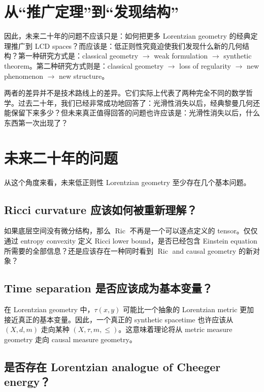 \documentclass[lualatex]{article}
\begin{document}
\section{从“推广定理”到“发现结构”}

因此，未来二十年的问题不应该只是：如何把更多 Lorentzian geometry 的经典定理推广到 LCD spaces？而应该是：低正则性究竟迫使我们发现什么新的几何结构？第一种研究方式是：classical geometry $\longrightarrow$ weak formulation $\longrightarrow$ synthetic theorem。第二种研究方式则是：classical geometry $\longrightarrow$ loss of regularity $\longrightarrow$ new phenomenon $\longrightarrow$ new structure。

两者的差异并不是技术路线上的差异。它们实际上代表了两种完全不同的数学哲学。过去二十年，我们已经非常成功地回答了：光滑性消失以后，经典黎曼几何还能保留下来多少？但未来真正值得回答的问题也许应该是：光滑性消失以后，什么东西第一次出现了？

\section{未来二十年的问题}

从这个角度来看，未来低正则性 Lorentzian geometry 至少存在几个基本问题。

\subsection{Ricci curvature 应该如何被重新理解？}

如果底层空间没有微分结构，那么 $\operatorname{Ric}$ 不再是一个可以逐点定义的 tensor。仅仅通过 entropy convexity 定义 Ricci lower bound，是否已经包含 Einstein equation 所需要的全部信息？还是应该存在一种同时看到 $\operatorname{Ric}$ and causal geometry 的新对象？

\subsection{Time separation 是否应该成为基本变量？}

在 Lorentzian geometry 中，$\tau(x,y)$ 可能比一个抽象的 Lorentzian metric 更加接近真正的基本变量。因此，一个真正的 synthetic spacetime 也许应该从 $(X,d,m)$ 走向某种 $(X,\tau,m,\leq)$。这意味着理论将从 metric measure geometry 走向 causal measure geometry。

\subsection{是否存在 Lorentzian analogue of Cheeger energy？}
\end{document}
